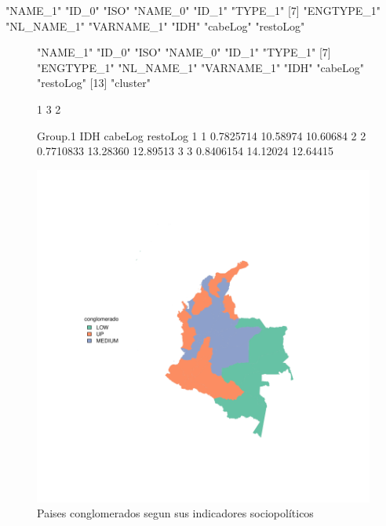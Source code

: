 \documentclass{article}
\begin{document}
\begin{Schunk}
\begin{Soutput}
 [1] "NAME_1"    "ID_0"      "ISO"       "NAME_0"    "ID_1"      "TYPE_1"   
 [7] "ENGTYPE_1" "NL_NAME_1" "VARNAME_1" "IDH"       "cabeLog"   "restoLog" 
\end{Soutput}
\end{Schunk}



\begin{figure}[h]
\centering

\begin{Schunk}
\begin{Soutput}
 [1] "NAME_1"    "ID_0"      "ISO"       "NAME_0"    "ID_1"      "TYPE_1"   
 [7] "ENGTYPE_1" "NL_NAME_1" "VARNAME_1" "IDH"       "cabeLog"   "restoLog" 
[13] "cluster"  
\end{Soutput}
\begin{Soutput}
[1] 1 3 2
\end{Soutput}
\begin{Soutput}
  Group.1       IDH  cabeLog restoLog
1       1 0.7825714 10.58974 10.60684
2       2 0.7710833 13.28360 12.89513
3       3 0.8406154 14.12024 12.64415
\end{Soutput}
\end{Schunk}
\includegraphics{FinaldeR-plotMap1}

\caption{Paises conglomerados segun sus indicadores sociopol\'iticos}\label{clustmap}
\end{figure}


\renewcommand{\refname}{Bibliografia}

\end{document}
